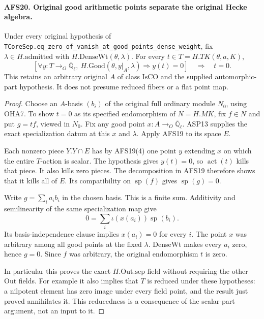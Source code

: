\paragraph{AFS20. Original good arithmetic points separate the original Hecke algebra.}
\label{claim:AFS20}
Under every original hypothesis of
\texttt{TCoreSep.eq\_zero\_of\_vanish\_at\_good\_points\_dense\_weight},
fix $\lambda\in H.\mathrm{admitted}$ with
$H.\mathrm{DenseWt}(\theta,\lambda)$.  For every $t\in
T=H.TK(\theta,a,K)$,
\[
 \left[
 \forall y:T\to_O\overline{\mathbb Q}_\ell,
 \ H.\mathrm{Good}(\theta,y|_A,\lambda)\Rightarrow y(t)=0
 \right]\quad\Longrightarrow\quad t=0.
\]
This retains an arbitrary original $A$ of class
$\mathrm{IsCO}$ and the supplied automorphic-part hypothesis.
It does not presume
reduced fibers or a flat point map.
\begin{proof}
Choose an $A$-basis $(b_i)$ of the original full ordinary
module $N_0$, using OHA7.  To show $t=0$ as its specified
endomorphism of $N=H.MK$, fix $f\in N$ and put $g=tf$,
viewed in $N_0$.  Fix any good point $x:A\to_O
\overline{\mathbb Q}_\ell$.  ASP13 supplies the exact
specialization datum at this $x$ and $\lambda$.  Apply
AFS19 to its space $E$.

Each nonzero piece $Y.Y\cap E$ has by AFS19(4) one
point $y$ extending $x$ on which the entire $T$-action
is scalar.  The hypothesis gives $y(t)=0$, so
$\operatorname{act}(t)$ kills that piece.  It also kills
zero pieces.  The decomposition in AFS19 therefore
shows that it kills all of $E$.  Its compatibility on
$\operatorname{sp}(f)$ gives $\operatorname{sp}(g)=0$.

Write $g=\sum_i a_i b_i$ in the chosen basis.  This is
a finite sum.  Additivity and semilinearity of the same
specialization map give
\[
             0=\sum_i\iota(x(a_i))\operatorname{sp}(b_i).
\]
Its basis-independence clause implies $x(a_i)=0$ for
every $i$.  The point $x$ was arbitrary among all good
points at the fixed $\lambda$.  DenseWt makes every
$a_i$ zero, hence $g=0$.  Since $f$ was arbitrary,
the original endomorphism $t$ is zero.

In particular this proves the exact $H.\mathrm{Out.sep}$
field without requiring the other $\mathrm{Out}$ fields.
For example it also implies that $T$ is reduced under
these hypotheses: a nilpotent element has zero image
under every field point, and the result just proved
annihilates it.  This reducedness is a consequence of
the scalar-part argument, not an input to it.
\end{proof}

